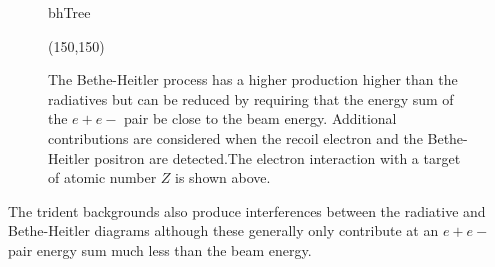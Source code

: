 \begin{figure}[H]
    \begin{center}
	\begin{fmffile}{bhTree}
	\begin{fmfgraph*}(150,150)
	\fmfstraight
		\fmffreeze
		\fmffreeze	
	\end{fmfgraph*}
	\end{fmffile}
  	\end{center}
    	\caption[Bethe-Heitler background]{The Bethe-Heitler process has a higher production higher than the radiatives but can be reduced by requiring that the energy sum of the $e+e-$ pair be close to the beam energy. Additional contributions are considered when the recoil electron and the Bethe-Heitler positron are detected.The electron interaction with a target of atomic number $Z$ is shown above.}
   	 \label{fig:bhTree}	
\end{figure}

The trident backgrounds also produce interferences between the radiative and Bethe-Heitler diagrams although these generally only contribute at an $e+e-$ pair energy sum much less than the beam energy. 